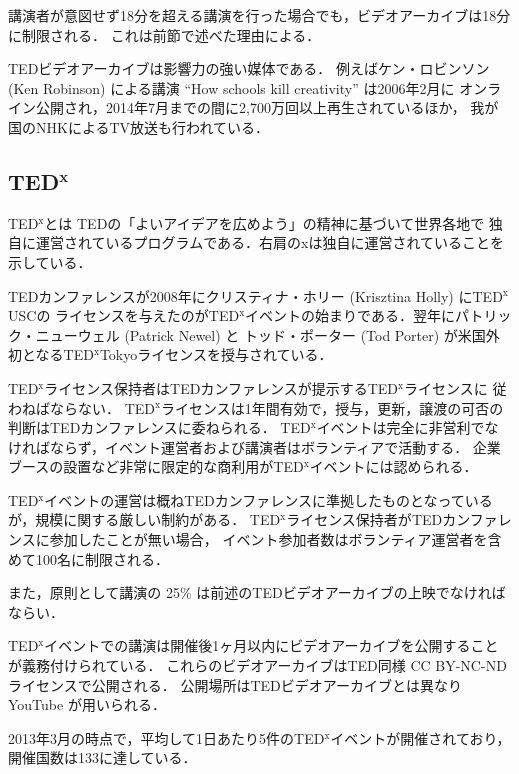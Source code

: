 \documentclass[submit,techreq,jkeyword,noauthor]{ipsj}
\newcommand{\TED}{\textrm{TED}}
\newcommand{\TEDx}{\TED${}^{\textrm{x}}$}
\newcommand{\TEDxTokyo}{\TEDx\textrm{Tokyo}}
\newcommand{\TEDxUSC}{\TEDx\textrm{USC}}
\newcommand{\TEDtitle}{\textbf{TED}}
\newcommand{\TEDxtitle}{\TEDtitle${}^{\textbf{x}}$}
\begin{document}
講演者が意図せず18分を超える講演を行った場合でも，ビデオアーカイブは18分に制限される．
これは前節で述べた理由による．

\TED ビデオアーカイブは影響力の強い媒体である．
例えばケン・ロビンソン (Ken Robinson) による講演 ``How schools kill creativity'' は2006年2月に
オンライン公開され，2014年7月までの間に2,700万回以上再生されているほか，
我が国のNHKによるTV放送も行われている．\cite{kr}


\subsection{\TEDxtitle}

\TEDx とは \TED の「よいアイデアを広めよう」の精神に基づいて世界各地で
独自に運営されているプログラムである．右肩のxは独自に運営されていることを示している．

\TED カンファレンスが2008年にクリスティナ・ホリー (Krisztina Holly) に\TEDxUSC の
ライセンスを与えたのが\TEDx イベントの始まりである．{翌年にパトリック・ニューウェル (Patrick Newel) と
トッド・ポーター (Tod Porter) が米国外初となる\TEDxTokyo ライセンスを授与されている．}

\TEDx ライセンス保持者は\TED カンファレンスが提示する\TEDx ライセンス\cite{tedxrules}に
従わねばならない．
\TEDx ライセンスは1年間有効で，授与，更新，譲渡の可否の判断は\TED カンファレンスに委ねられる．
\TEDx イベントは完全に非営利でなければならず，イベント運営者および講演者はボランティアで活動する．
企業ブースの設置など非常に限定的な商利用が\TEDx イベントには認められる．

\TEDx イベントの運営は概ね\TED カンファレンスに準拠したものとなっているが，規模に関する厳しい制約がある．
\TEDx ライセンス保持者が\TED カンファレンスに参加したことが無い場合，
イベント参加者数はボランティア運営者を含めて100名に制限される．

また，原則として講演の 25\% は前述の\TED ビデオアーカイブの上映でなければならい．

\TEDx イベントでの講演は開催後1ヶ月以内にビデオアーカイブを公開することが義務付けられている．
これらのビデオアーカイブは\TED 同様 CC BY-NC-ND ライセンスで公開される．
公開場所は\TED ビデオアーカイブとは異なり YouTube が用いられる．


2013年3月の時点で，平均して1日あたり5件の\TEDx イベントが開催されており，
開催国数は133に達している．\cite{nh,mf}
\end{document}
